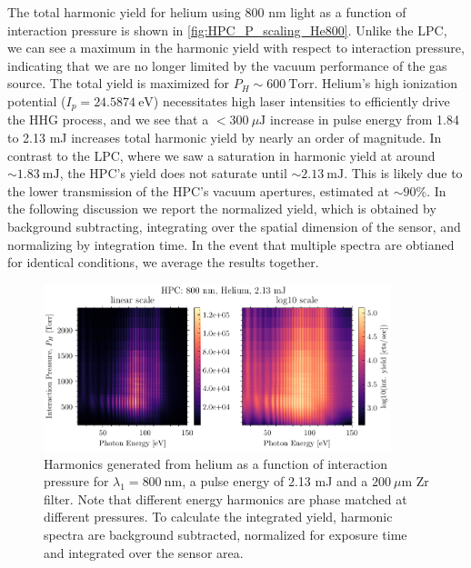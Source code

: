 The total harmonic yield for helium using 800 nm light as a function of interaction pressure is shown in \cref{fig:HPC_P_scaling_He800}. Unlike the LPC, we can see a maximum in the harmonic yield with respect to interaction pressure, indicating that we are no longer limited by the vacuum performance of the gas source. The total yield is maximized for $P_H \sim 600 \ \textrm{Torr}$. Helium's high ionization potential ($I_p = 24.5874 \ \textrm{eV}$) necessitates high laser intensities to efficiently drive the HHG process, and we see that a $<300 \ \mu \textrm{J}$ increase in pulse energy from 1.84 to 2.13 mJ increases total harmonic yield by nearly an order of magnitude. In contrast to the LPC, where we saw a saturation in harmonic yield at around $\sim 1.83 \ \textrm{mJ}$, the HPC's yield does not saturate until $\sim 2.13 \ \textrm{mJ}$. This is likely due to the lower transmission of the HPC's vacuum apertures, estimated at $\sim 90 \%$. In the following discussion we report the normalized yield, which is obtained by background subtracting, integrating over the spatial dimension of the sensor, and normalizing by integration time. In the event that multiple spectra are obtianed for identical conditions, we average the results together.

\begin{figure}
	\centering
	\includegraphics[width=0.9\textwidth]{figures/chap3/HPC_800nm_He_spectrogram.pdf}
	\caption{Harmonics generated from helium as a function of interaction pressure for $\lambda_1 = 800 \ \textrm{nm}$, a pulse energy of 2.13 mJ and a $200 \ \mu \textrm{m}$ Zr filter. Note that different energy harmonics are phase matched at different pressures. To calculate the integrated yield, harmonic spectra are background subtracted, normalized for exposure time and integrated over the sensor area.}
	\label{fig:HPC_800nm_He_spectrogram}
\end{figure}

